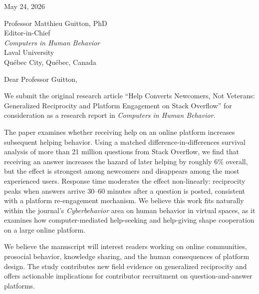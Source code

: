 \documentclass[12pt]{article}
\begin{document}
\noindent May 24, 2026

\vspace{1em}

\noindent Professor Matthieu Guitton, PhD\\
Editor-in-Chief\\
\textit{Computers in Human Behavior}\\
Laval University\\
Qu\'{e}bec City, Qu\'{e}bec, Canada

\vspace{1em}

\noindent Dear Professor Guitton,

\vspace{0.5em}

\noindent We submit the original research article ``Help Converts Newcomers, Not Veterans: Generalized Reciprocity and Platform Engagement on Stack Overflow'' for consideration as a research report in \textit{Computers in Human Behavior}.

\vspace{0.5em}

\noindent The paper examines whether receiving help on an online platform increases subsequent helping behavior. Using a matched difference-in-differences survival analysis of more than 21 million questions from Stack Overflow, we find that receiving an answer increases the hazard of later helping by roughly 6\% overall, but the effect is strongest among newcomers and disappears among the most experienced users. Response time moderates the effect non-linearly: reciprocity peaks when answers arrive 30--60 minutes after a question is posted, consistent with a platform re-engagement mechanism. We believe this work fits naturally within the journal's \textit{Cyberbehavior} area on human behavior in virtual spaces, as it examines how computer-mediated help-seeking and help-giving shape cooperation on a large online platform.

\vspace{0.5em}

\noindent We believe the manuscript will interest readers working on online communities, prosocial behavior, knowledge sharing, and the human consequences of platform design. The study contributes new field evidence on generalized reciprocity and offers actionable implications for contributor recruitment on question-and-answer platforms.

\vspace{0.5em}
\end{document}
